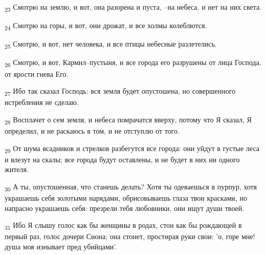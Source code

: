 \begin{tcolorbox}
\textsubscript{23} Смотрю на землю, и вот, она разорена и пуста, --на небеса, и нет на них света.
\end{tcolorbox}
\begin{tcolorbox}
\textsubscript{24} Смотрю на горы, и вот, они дрожат, и все холмы колеблются.
\end{tcolorbox}
\begin{tcolorbox}
\textsubscript{25} Смотрю, и вот, нет человека, и все птицы небесные разлетелись.
\end{tcolorbox}
\begin{tcolorbox}
\textsubscript{26} Смотрю, и вот, Кармил--пустыня, и все города его разрушены от лица Господа, от ярости гнева Его.
\end{tcolorbox}
\begin{tcolorbox}
\textsubscript{27} Ибо так сказал Господь: вся земля будет опустошена, но совершенного истребления не сделаю.
\end{tcolorbox}
\begin{tcolorbox}
\textsubscript{28} Восплачет о сем земля, и небеса помрачатся вверху, потому что Я сказал, Я определил, и не раскаюсь в том, и не отступлю от того.
\end{tcolorbox}
\begin{tcolorbox}
\textsubscript{29} От шума всадников и стрелков разбегутся все города: они уйдут в густые леса и влезут на скалы; все города будут оставлены, и не будет в них ни одного жителя.
\end{tcolorbox}
\begin{tcolorbox}
\textsubscript{30} А ты, опустошенная, что станешь делать? Хотя ты одеваешься в пурпур, хотя украшаешь себя золотыми нарядами, обрисовываешь глаза твои красками, но напрасно украшаешь себя: презрели тебя любовники, они ищут души твоей.
\end{tcolorbox}
\begin{tcolorbox}
\textsubscript{31} Ибо Я слышу голос как бы женщины в родах, стон как бы рождающей в первый раз, голос дочери Сиона; она стонет, простирая руки свои: 'о, горе мне! душа моя изнывает пред убийцами'.
\end{tcolorbox}
